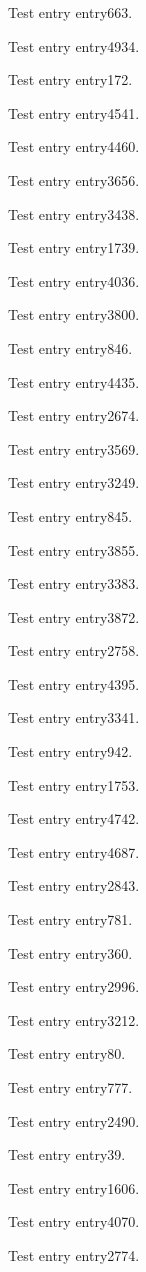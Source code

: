 Test entry \gls{entry663}.

Test entry \gls{entry4934}.

Test entry \gls{entry172}.

Test entry \gls{entry4541}.

Test entry \gls{entry4460}.

Test entry \gls{entry3656}.

Test entry \gls{entry3438}.

Test entry \gls{entry1739}.

Test entry \gls{entry4036}.

Test entry \gls{entry3800}.

Test entry \gls{entry846}.

Test entry \gls{entry4435}.

Test entry \gls{entry2674}.

Test entry \gls{entry3569}.

Test entry \gls{entry3249}.

Test entry \gls{entry845}.

Test entry \gls{entry3855}.

Test entry \gls{entry3383}.

Test entry \gls{entry3872}.

Test entry \gls{entry2758}.

Test entry \gls{entry4395}.

Test entry \gls{entry3341}.

Test entry \gls{entry942}.

Test entry \gls{entry1753}.

Test entry \gls{entry4742}.

Test entry \gls{entry4687}.

Test entry \gls{entry2843}.

Test entry \gls{entry781}.

Test entry \gls{entry360}.

Test entry \gls{entry2996}.

Test entry \gls{entry3212}.

Test entry \gls{entry80}.

Test entry \gls{entry777}.

Test entry \gls{entry2490}.

Test entry \gls{entry39}.

Test entry \gls{entry1606}.

Test entry \gls{entry4070}.

Test entry \gls{entry2774}.

